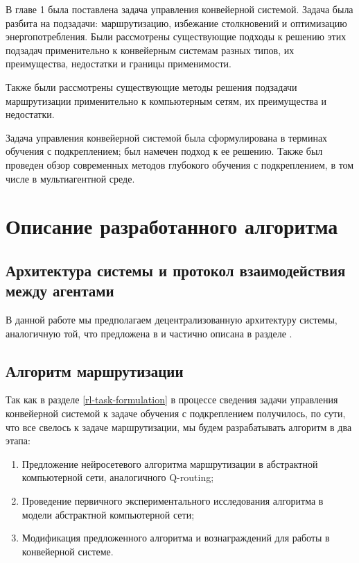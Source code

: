 \documentclass[specification,annotation,times]{itmo-student-thesis}
\theoremstyle{definition}
\begin{document}
\chapterconclusion

В главе 1 была поставлена задача управления конвейерной системой. Задача была
разбита на подзадачи: маршрутизацию, избежание столкновений и оптимизацию
энергопотребления. Были рассмотрены существующие подходы к решению этих подзадач
применительно к конвейерным системам разных типов, их преимущества, недостатки и
границы применимости.

Также были рассмотрены существующие методы решения подзадачи маршрутизации
применительно к компьютерным сетям, их преимущества и недостатки.

Задача управления конвейерной системой была сформулирована в терминах обучения с
подкреплением; был намечен подход к ее решению. Также был проведен обзор
современных методов глубокого обучения с подкреплением, в том числе в
мультиагентной среде.

\finishrelatedwork

\chapter{Описание разработанного алгоритма}

\section{Архитектура системы и протокол взаимодействия между агентами}

В данной работе мы предполагаем децентрализованную архитектуру системы,
аналогичную той, что предложена в \cite{black2009intelligent,
  vyatkin-controllers} и частично описана в разделе \label{vyatkin-method}. 

\section{Алгоритм маршрутизации}

Так как в разделе \ref{rl-task-formulation} в процессе сведения задачи
управления конвейерной системой к задаче обучения с подкреплением получилось, по
сути, что все свелось к задаче маршрутизации, мы будем разрабатывать алгоритм в
два этапа:

\begin{enumerate}
\item Предложение нейросетевого алгоритма маршрутизации в абстрактной
  компьютерной сети, аналогичного Q-routing;
\item Проведение первичного экспериментального исследования алгоритма в модели
  абстрактной компьютерной сети;
\item Модификация предложенного алгоритма и вознаграждений для работы в
  конвейерной системе.
\end{enumerate}
\end{document}
